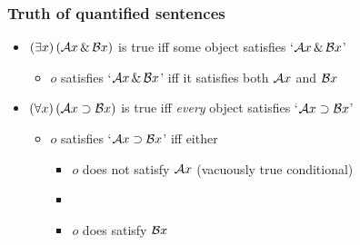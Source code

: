 \begin{frame}
  \frametitle{Truth of quantified sentences}
\large 
  \begin{itemize}[<+->]
    \item $(\exists x)\,(\mathcal{A}x \,\&\, \mathcal{B}x)$ is true iff \textcolor{OGlyallpink}{some} object satisfies `$\mathcal{A}x \,\&\, \mathcal{B}x$'
    \begin{itemize}
      \item $o$ satisfies `$\mathcal{A}x \,\&\, \mathcal{B}x$' iff it satisfies both $\mathcal{A}x$ and $\mathcal{B}x$
    \end{itemize}
    
\bigskip

    \item $(\forall x)\,(\mathcal{A}x \supset \mathcal{B}x)$ is true iff \emph{every} object satisfies `$\mathcal{A}x \supset \mathcal{B}x$'
    \medskip
    \begin{itemize} 
    \large 
      \item $o$ satisfies `$\mathcal{A}x \supset \mathcal{B}x$' iff
      either
      \bigskip
      \begin{itemize}  
      \normalsize
        \item $o$ does not satisfy $\mathcal{A}x$ (vacuously true conditional)
        \item[] 
        \item $o$ does satisfy $\mathcal{B}x$
      \end{itemize}
       \bigskip
    \end{itemize}
  \end{itemize}
\end{frame}


